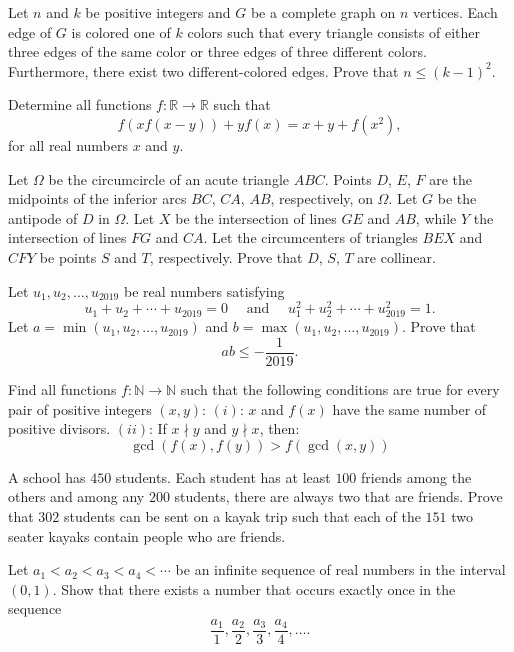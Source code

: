 \documentclass[11pt]{scrartcl}
\begin{document}
\begin{problem}[785479468600231]
Let $n$ and $k$ be positive integers and $G$ be a complete graph on $n$ vertices. Each edge of $G$ is colored one of $k$ colors such that every triangle consists of either three edges of the same color or three edges of three different colors. Furthermore, there exist two different-colored edges. Prove that $n\le(k-1)^2$.
\end{problem}
\begin{problem}[716406996122549]
Determine all functions $f: \mathbb{R} \rightarrow \mathbb{R}$ such that$$f(xf(x-y))+yf(x)=x+y+f(x^2),$$for all real numbers $x$ and $y.$
\end{problem}
\begin{problem}[607556370102952]
Let $\Omega$ be the circumcircle of an acute triangle $ABC$. Points $D$, $E$, $F$ are the midpoints of the inferior arcs $BC$, $CA$, $AB$, respectively, on $\Omega$. Let $G$ be the antipode of $D$ in $\Omega$. Let $X$ be the intersection of lines $GE$ and $AB$, while $Y$ the intersection of lines $FG$ and $CA$. Let the circumcenters of triangles $BEX$ and $CFY$ be points $S$ and $T$, respectively. Prove that $D$, $S$, $T$ are collinear.
\end{problem}
\begin{problem}[3192129869376364982]
Let $u_1, u_2, \dots, u_{2019}$ be real numbers satisfying\[u_{1}+u_{2}+\cdots+u_{2019}=0 \quad \text { and } \quad u_{1}^{2}+u_{2}^{2}+\cdots+u_{2019}^{2}=1.\]Let $a=\min \left(u_{1}, u_{2}, \ldots, u_{2019}\right)$ and $b=\max \left(u_{1}, u_{2}, \ldots, u_{2019}\right)$. Prove that
\[
a b \leqslant-\frac{1}{2019}.
\]
\end{problem}
\begin{problem}[6566978587694479725]
Find all functions $f : \mathbb{N} \rightarrow \mathbb{N}$ such that the following conditions are true for every pair of positive integers $(x, y)$:
$(i)$: $x$ and $f(x)$ have the same number of positive divisors.
$(ii)$: If $x \nmid y$ and $y \nmid x$, then:
$$\gcd(f(x), f(y)) > f(\gcd(x, y))$$
\end{problem}
\begin{problem}[8005762280394288133]
A school has $450$ students. Each student has at least $100$ friends among the others and among any $200$ students, there are always two that are friends. Prove that $302$ students can be sent on a kayak trip such that each of the $151$ two seater kayaks contain people who are friends.
\end{problem}
\begin{problem}[8048961544243923335]
Let $a_1<a_2<a_3<a_4<\cdots$ be an infinite sequence of real numbers in the interval $(0,1)$. Show that there exists a number that occurs exactly once in the sequence
\[ \frac{a_1}{1},\frac{a_2}{2},\frac{a_3}{3},\frac{a_4}{4},\ldots.\]
\end{problem}
\end{document}
